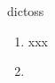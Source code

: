 \begin{prework}{ dictoss }
  \begin{enumerate}
  \item xxx
  \item 
  \end{enumerate}
\end{prework}
